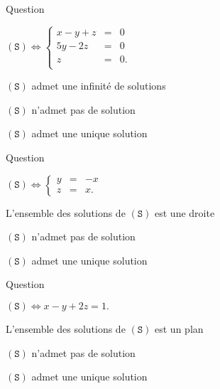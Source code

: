 

\begin{multi}[multiple,feedback=
{L'algorithme de Gauss donne :
\[ (\mathtt{S})  \Leftrightarrow  \left\{\begin{array}{rcc}
x-y+z&=&0\\
5y-2z&=&0\\ 
z&=&0.\end{array}\right.\]
Donc \((\mathtt{S})\) admet une unique solution : \((0,0,0)\).
}]{Question}
    \item* \((\mathtt{S}) \Leftrightarrow  \left\{\begin{array}{rcc}
x-y+z&=&0\\
5y-2z&=&0\\
z&=&0.\\
\end{array}\right.\)
    \item \((\mathtt{S})\) admet une infinité de solutions
    \item \((\mathtt{S})\) n'admet pas de solution
    \item* \((\mathtt{S})\) admet une unique solution
\end{multi}


\begin{multi}[multiple,feedback=
{\[(\mathtt{S}) \Leftrightarrow  \left\{\begin{array}{rcc}
y&=&-x\\
z&=&x.\end{array}\right.\]
L'ensemble des solutions de \((\mathtt{S})\) est la droite : \(\{(x,-x,x)\, ; \; x \in \Rr\}\).
}]{Question}
    \item* \((\mathtt{S}) \Leftrightarrow  \left\{\begin{array}{rcc}
y&=&-x\\
z&=&x.\end{array}\right.\)
    \item* L'ensemble des solutions de \((\mathtt{S})\) est une droite
    \item \((\mathtt{S})\) n'admet pas de solution
    \item \((\mathtt{S})\) admet une unique solution
\end{multi}


\begin{multi}[multiple,feedback=
{\( (\mathtt{S}) \Leftrightarrow  
x-y+2z=0\).
L'ensemble des solutions de \((\mathtt{S})\) est un plan.
}]{Question}
    \item* \((\mathtt{S}) \Leftrightarrow
x-y+2z=1.\)
    \item* L'ensemble des solutions de \((\mathtt{S})\) est un plan
    \item \((\mathtt{S})\) n'admet pas de solution
    \item \((\mathtt{S})\) admet une unique solution
\end{multi}



